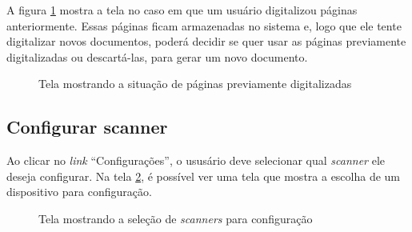 A figura \ref{fig:dig_8} mostra a tela no caso em que um usuário digitalizou páginas anteriormente. Essas páginas ficam armazenadas no sistema e, logo que ele tente digitalizar novos documentos, poderá decidir se quer usar as páginas previamente digitalizadas ou descartá-las, para gerar um novo documento.

\begin{figure}[h]
 \centering
    \setlength\fboxsep{0pt}
    \setlength\fboxrule{0.5pt}
  \caption {Tela mostrando a situação de páginas previamente digitalizadas}
  \label{fig:dig_8}
\end{figure}



\subsection{Configurar scanner}
\label{sec:mockups_configurar}

Ao clicar no {\it link} ``Configurações'', o ususário deve selecionar qual {\it scanner} ele deseja configurar. Na tela \ref{fig:config_1}, é possível ver uma tela que mostra a escolha de um dispositivo para configuração.

\begin{figure}[h]
 \centering
    \setlength\fboxsep{0pt}
    \setlength\fboxrule{0.5pt}
  \caption {Tela mostrando a seleção de {\it scanners} para configuração}
  \label{fig:config_1}
\end{figure}

